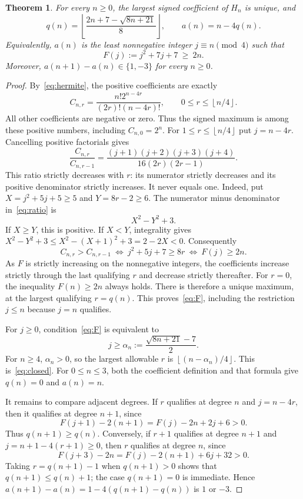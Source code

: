 \documentclass[11pt]{article}
\newtheorem{theorem}{Theorem}
\newcommand{\floor}[1]{\left\lfloor #1\right\rfloor}
\begin{document}
\begin{theorem}\label{thm:signed}
For every $n\geq0$, the largest signed coefficient of $H_n$ is unique, and
\begin{equation}\label{eq:closed}
 q(n)=\floor{\frac{2n+7-\sqrt{8n+21}}8},\qquad a(n)=n-4q(n).
\end{equation}
Equivalently, $a(n)$ is the least nonnegative integer $j\equiv n\pmod4$
such that
\begin{equation}\label{eq:F}
 F(j):=j^2+7j+7\ \geq\ 2n.
\end{equation}
Moreover, $a(n+1)-a(n)\in\{1,-3\}$ for every $n\geq0$.
\end{theorem}

\begin{proof}
By~\eqref{eq:hermite}, the positive coefficients are exactly
\[
 C_{n,r}=\frac{n!2^{n-4r}}{(2r)!(n-4r)!},
 \qquad 0\leq r\leq\floor{n/4}.
\]
All other coefficients are negative or zero. Thus the signed maximum
is among these positive numbers, including $C_{n,0}=2^n$.
For $1\leq r\leq\floor{n/4}$ put $j=n-4r$. Cancelling positive
factorials gives
\begin{equation}\label{eq:ratio}
 \frac{C_{n,r}}{C_{n,r-1}}
 =\frac{(j+1)(j+2)(j+3)(j+4)}{16(2r)(2r-1)}.
\end{equation}
This ratio strictly decreases with $r$: its numerator strictly decreases
and its positive denominator strictly increases.
It never equals one. Indeed, put $X=j^2+5j+5\geq5$ and $Y=8r-2\geq6$.
The numerator minus denominator in~\eqref{eq:ratio} is
\begin{equation}\label{eq:squares}
 X^2-Y^2+3.
\end{equation}
If $X\geq Y$, this is positive. If $X<Y$, integrality gives
$X^2-Y^2+3\leq X^2-(X+1)^2+3=2-2X<0$.
Consequently
\[
 C_{n,r}>C_{n,r-1}
 \ \Longleftrightarrow\ j^2+5j+7\geq8r
 \ \Longleftrightarrow\ F(j)\geq2n.
\]
As $F$ is strictly increasing on the nonnegative integers, the coefficients
increase strictly through the last qualifying $r$ and decrease strictly
thereafter. For $r=0$, the inequality $F(n)\geq2n$ always holds.
There is therefore a unique maximum, at the largest qualifying $r=q(n)$.
This proves~\eqref{eq:F}, including the restriction $j\leq n$ because
$j=n$ qualifies.

For $j\geq0$, condition~\eqref{eq:F} is equivalent to
\[
 j\geq\alpha_n:=\frac{\sqrt{8n+21}-7}{2}.
\]
For $n\geq4$, $\alpha_n>0$, so the largest allowable $r$ is
$\floor{(n-\alpha_n)/4}$. This is~\eqref{eq:closed}.
For $0\leq n\leq3$, both the coefficient definition and that formula give
$q(n)=0$ and $a(n)=n$.

It remains to compare adjacent degrees. If $r$ qualifies at degree $n$
and $j=n-4r$, then it qualifies at degree $n+1$, since
\[
 F(j+1)-2(n+1)=F(j)-2n+2j+6>0.
\]
Thus $q(n+1)\geq q(n)$. Conversely, if $r+1$ qualifies at degree $n+1$
and $j=n+1-4(r+1)\geq0$, then $r$ qualifies at degree $n$, since
\[
 F(j+3)-2n=F(j)-2(n+1)+6j+32>0.
\]
Taking $r=q(n+1)-1$ when $q(n+1)>0$ shows that
$q(n+1)\leq q(n)+1$; the case $q(n+1)=0$ is immediate.
Hence $a(n+1)-a(n)=1-4(q(n+1)-q(n))$ is $1$ or $-3$.
\end{proof}
\end{document}
